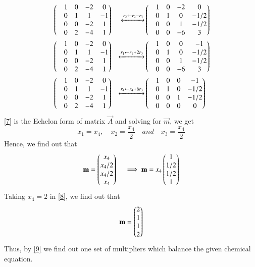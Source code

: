 \documentclass[journal,12pt,twocolumn]{IEEEtran}
\begin{document}
\begin{align}
 &\begin{pmatrix}&1 &0 &-2 &0 \\ &0 &1 &1 &-1 \\ &0 &0 &-2 &1 \\&0 &2 &-4 &1\end{pmatrix} 
 &\xleftrightarrow[]{r_2 \leftarrow r_2 - r_3 } &\begin{pmatrix}&1 &0 &-2 &0 \\ &0 &1 &0 &-1/2 \\ &0 &0 &1 &-1/2 \\&0 &0 &-6 &3\end{pmatrix} \\
 &\begin{pmatrix}&1 &0 &-2 &0 \\ &0 &1 &1 &-1 \\ &0 &0 &-2 &1 \\&0 &2 &-4 &1\end{pmatrix} 
 &\xleftrightarrow[]{r_1 \leftarrow r_1 + 2r_3 } &\begin{pmatrix}&1 &0 &0 &-1 \\ &0 &1 &0 &-1/2 \\ &0 &0 &1 &-1/2 \\&0 &0 &-6 &3\end{pmatrix} \\
 &\begin{pmatrix}&1 &0 &-2 &0 \\ &0 &1 &1 &-1 \\ &0 &0 &-2 &1 \\&0 &2 &-4 &1\end{pmatrix} 
 &\xleftrightarrow[]{r_4 \leftarrow r_4 + 6r_3 } &\begin{pmatrix}&1 &0 &0 &-1 \\ &0 &1 &0 &-1/2 \\ &0 &0 &1 &-1/2 \\&0 &0 &0 &0\end{pmatrix} \label{7}
\end{align}
 \ref{7} is the Echelon form of matrix $\vec{A}$ and solving for $\vec{m}$, we get
 \begin{equation}
 	x_1 = x_4,\quad x_2 = \frac{x_4}{2} \quad and \quad x_3 = \frac{x_4}{2} 
 \end{equation} 
Hence, we find out that
\begin{equation}\label{8}
	\mathbf{m} = \begin{pmatrix}x_4 \\ x_4/2 \\ x_4/2 \\ x_4\end{pmatrix} \quad \implies \mathbf{m} = x_4 \begin{pmatrix}1 \\ 1/2 \\ 1/2 \\1\end{pmatrix}
\end{equation}
Taking $x_4 =2$ in \ref{8}, we find out that
\begin{equation}\label{9}
	\mathbf{m} = \begin{pmatrix}2 \\ 1\\ 1\\ 2\end{pmatrix}
\end{equation}
Thus, by \ref{9} we find out one set of multipliers which balance the given chemical equation.
\end{document}
